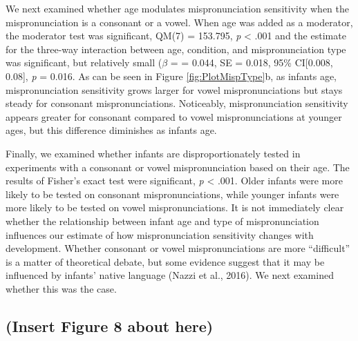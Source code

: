 \documentclass[man]{apa6}
\begin{document}
We next examined whether age modulates mispronunciation sensitivity when the mispronunciation is a consonant or a vowel. When age was added as a moderator, the moderator test was significant, QM(7) = 153.795, \emph{p} \textless{} .001 and the estimate for the three-way interaction between age, condition, and mispronunciation type was significant, but relatively small (\(\beta\) = = 0.044, SE = 0.018, 95\% CI{[}0.008, 0.08{]}, \emph{p} = 0.016. As can be seen in Figure \ref{fig:PlotMispType}b, as infants age, mispronunciation sensitivity grows larger for vowel mispronunciations but stays steady for consonant mispronunciations. Noticeably, mispronunciation sensitivity appears greater for consonant compared to vowel mispronunciations at younger ages, but this difference diminishes as infants age.

Finally, we examined whether infants are disproportionately tested in experiments with a consonant or vowel mispronunciation based on their age. The results of Fisher's exact test were significant, \emph{p} \textless{} .001. Older infants were more likely to be tested on consonant mispronunciations, while younger infants were more likely to be tested on vowel mispronunciations. It is not immediately clear whether the relationship between infant age and type of mispronunciation influences our estimate of how mispronunciation sensitivity changes with development. Whether consonant or vowel mispronunciations are more \enquote{difficult} is a matter of theoretical debate, but some evidence suggest that it may be influenced by infants' native language (Nazzi et al., 2016). We next examined whether this was the case.

\hypertarget{insert-figure-8-about-here}{%
\subsection{(Insert Figure 8 about here)}\label{insert-figure-8-about-here}}
\end{document}

